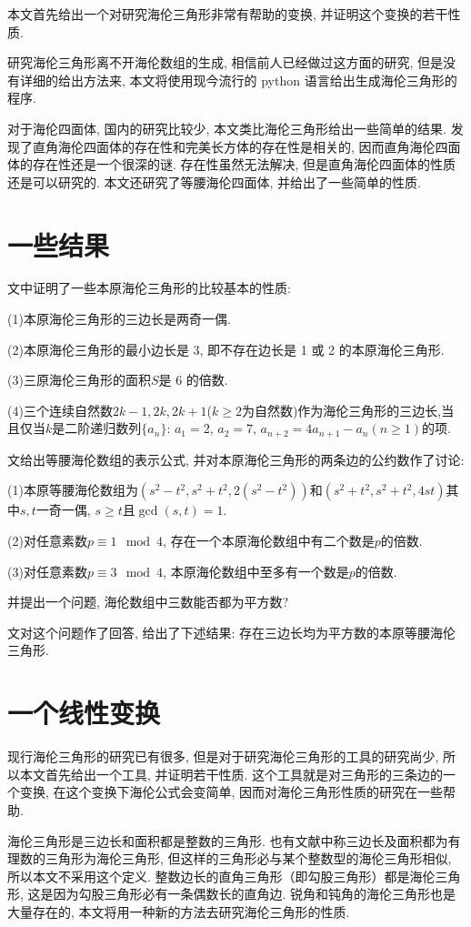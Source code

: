 \documentclass[12pt]{article}
\begin{document}
本文首先给出一个对研究海伦三角形非常有帮助的变换, 并证明这个变换的若干性质.

研究海伦三角形离不开海伦数组的生成, 相信前人已经做过这方面的研究, 但是没有详细的给出方法来, 本文将使用现今流行的 python 语言给出生成海伦三角形的程序.

对于海伦四面体, 国内的研究比较少, 本文类比海伦三角形给出一些简单的结果. 发现了直角海伦四面体的存在性和完美长方体的存在性是相关的, 因而直角海伦四面体的存在性还是一个很深的谜. 存在性虽然无法解决, 但是直角海伦四面体的性质还是可以研究的. 本文还研究了等腰海伦四面体, 并给出了一些简单的性质. 
\section{一些结果}
文\cite{daoxuan}中证明了一些本原海伦三角形的比较基本的性质: \par
(1)本原海伦三角形的三边长是两奇一偶.\par
(2)本原海伦三角形的最小边长是 3, 即不存在边长是 1 或 2 的本原海伦三角形.\par
(3)三原海伦三角形的面积$S$是 6 的倍数.\par
(4)三个连续自然数$2k-1,2k,2k+1$($k\ge2$为自然数)作为海伦三角形的三边长,当且仅当$k$是二阶递归数列$\{a_n\}$: $a_1=2$, $a_2=7$, $a_{n+2}=4a_{n+1}-a_n(n\ge1)$的项.\par

文\cite{denggao}给出等腰海伦数组的表示公式, 并对本原海伦三角形的两条边的公约数作了讨论: \par
(1)本原等腰海伦数组为$(s^2-t^2,s^2+t^2,2(s^2-t^2))$和$(s^2+t^2,s^2+t^2,4st)$其中$s,t$一奇一偶, $s\ge t$且$\gcd(s,t)=1$.\par
(2)对任意素数$p\equiv1\mod4$, 存在一个本原海伦数组中有二个数是$p$的倍数.\par
(3)对任意素数$p\equiv3\mod4$, 本原海伦数组中至多有一个数是$p$的倍数.\par
并提出一个问题, 海伦数组中三数能否都为平方数?

文\cite{huangxi}对这个问题作了回答, 给出了下述结果: 存在三边长均为平方数的本原等腰海伦三角形.

\section{一个线性变换}
现行海伦三角形的研究已有很多, 但是对于研究海伦三角形的工具的研究尚少, 所以本文首先给出一个工具, 并证明若干性质. 这个工具就是对三角形的三条边的一个变换, 在这个变换下海伦公式会变简单, 因而对海伦三角形性质的研究在一些帮助. 

海伦三角形是三边长和面积都是整数的三角形. 也有文献中称三边长及面积都为有理数的三角形为海伦三角形, 但这样的三角形必与某个整数型的海伦三角形相似, 所以本文不采用这个定义. 整数边长的直角三角形（即勾股三角形）都是海伦三角形, 这是因为勾股三角形必有一条偶数长的直角边. 锐角和钝角的海伦三角形也是大量存在的, 本文将用一种新的方法去研究海伦三角形的性质. 
\end{document}
